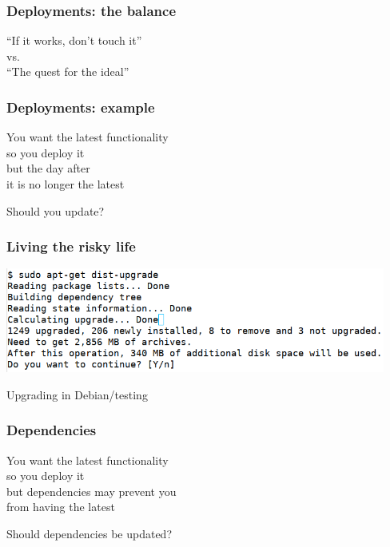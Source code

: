 \documentclass[17pt,aspectratio=169,hyperref=pdfusetitle]{beamer}
\begin{document}
\begin{frame}[fragile]
  \frametitle{Deployments: the balance}


    {\Large
    \begin{center}
    ``If it works, don't touch it'' \\
    vs. \\
    ``The quest for the ideal'' \\
    \end{center}
  }
  
\end{frame}

\begin{frame}[fragile]
  \frametitle{Deployments: example}

  You want the latest functionality \\
  so you deploy it \\
  but the day after \\
  it is no longer the latest \\

  \begin{flushright}
    Should you update?
  \end{flushright}

\end{frame}

\begin{frame}[fragile]
  \frametitle{Living the risky life}

  \begin{center}
  \includegraphics[width=12.5cm]{figs/dist-upgrade}
  \end{center}  

  Upgrading in Debian/testing
  
\end{frame}

\begin{frame}[fragile]
  \frametitle{Dependencies}

  You want the latest functionality \\
  so you deploy it \\
  but dependencies may prevent you \\
  from having the latest \\

  \begin{flushright}
    Should dependencies be updated?
  \end{flushright}

\end{frame}
\end{document}

